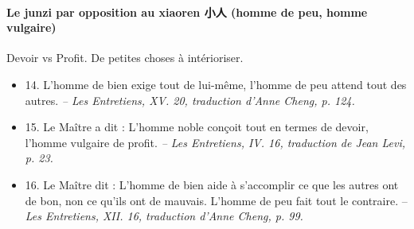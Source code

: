 \paragraph{Le junzi par opposition au xiaoren 小人 (homme de peu, homme vulgaire)  }
\begin{Synthesis}
    Devoir vs Profit. 
    De petites choses à intérioriser. 
\end{Synthesis}
\begin{itemize}

\item 14. \newline L’homme de bien exige tout de lui-même, l’homme de peu attend tout des autres.  \textit{\small -- Les Entretiens, XV. 20, traduction d’Anne Cheng, p. 124.  }
\item 15. \newline Le Maître a dit :  L’homme noble conçoit tout en termes de devoir, l’homme vulgaire de profit. \textit{\small -- Les Entretiens, IV. 16, traduction de Jean Levi, p. 23.  }
\item 16. \newline Le Maître dit : L’homme de bien aide à s’accomplir ce que les autres ont de bon, non ce qu’ils ont de mauvais. L’homme de peu fait tout le contraire.  -- \textit{\small Les Entretiens, XII.  16, traduction d’Anne Cheng, p. 99.  }
\end{itemize}
